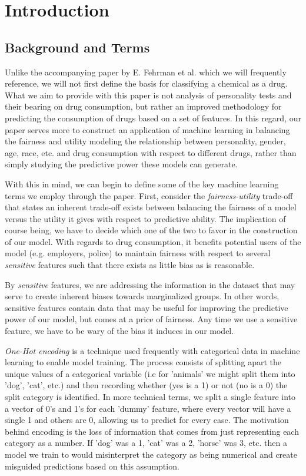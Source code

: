 \documentclass{article}
\begin{document}
\section{Introduction}
    \subsection*{Background and Terms}
    Unlike the accompanying paper by E. Fehrman et al. which we will frequently reference, we will not first define the basis for classifying a chemical as a drug. What we aim to provide with this paper is not analysis of personality tests and their bearing on drug consumption, but rather an improved methodology for predicting the consumption of drugs based on a set of features. In this regard, our paper serves more to construct an application of machine learning in balancing the fairness and utility modeling the relationship between personality, gender, age, race, etc. and drug consumption with respect to different drugs, rather than simply studying the predictive power these models can generate.

    With this in mind, we can begin to define some of the key machine learning terms we employ through the paper. First, consider the \textit{fairness-utility} trade-off that states an inherent trade-off exists between balancing the fairness of a model versus the utility it gives with respect to predictive ability. The implication of course being, we have to decide which one of the two to favor in the construction of our model. With regards to drug consumption, it benefits potential users of the model (e.g. employers, police) to maintain fairness with respect to several \textit{sensitive} features such that there exists as little bias as is reasonable.

    By \textit{sensitive} features, we are addressing the information in the dataset that may serve to create inherent biases towards marginalized groups. In other words, sensitive features contain data that may be useful for improving the predictive power of our model, but comes at a price of fairness. Any time we use a sensitive feature, we have to be wary of the bias it induces in our model.

    \textit{One-Hot encoding} is a technique used frequently with categorical data in machine learning to enable model training. The process consists of splitting apart the unique values of a categorical variable (i.e for 'animals' we might split them into 'dog', 'cat', etc.) and then recording whether (yes is a 1) or not (no is a 0) the split category is identified. In more technical terms, we split a single feature into a vector of 0's and 1's for each 'dummy' feature, where every vector will have a single 1 and others are 0, allowing us to predict for every case. The motivation behind encoding is the loss of information that comes from just representing each category as a number. If 'dog' was a 1, 'cat' was a 2, 'horse' was 3, etc. then a model we train to would misinterpret the category as being numerical and create misguided predictions based on this assumption.
\end{document}
